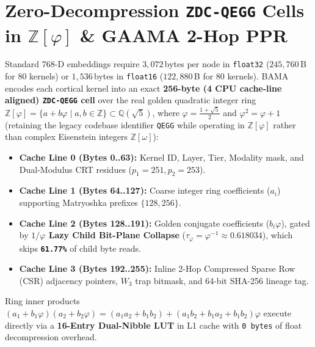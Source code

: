 \documentclass[10pt,twocolumn,letterpaper]{article}
\begin{document}
\section{Zero-Decompression \texttt{ZDC-QEGG} Cells in $\mathbb{Z}[\varphi]$ \& GAAMA 2-Hop PPR}
Standard 768-D embeddings require $3,072$\,bytes per node in \texttt{float32} ($245,760$\,B for 80 kernels) or $1,536$\,bytes in \texttt{float16} ($122,880$\,B for 80 kernels). BAMA encodes each cortical kernel into an exact \textbf{256-byte (4 CPU cache-line aligned) \texttt{ZDC-QEGG} cell} over the real golden quadratic integer ring $\mathbb{Z}[\varphi] = \{a + b\varphi \mid a,b \in \mathbb{Z}\} \subset \mathbb{Q}(\sqrt{5})$, where $\varphi = \frac{1+\sqrt{5}}{2}$ and $\varphi^2 = \varphi + 1$ (retaining the legacy codebase identifier \texttt{QEGG} while operating in $\mathbb{Z}[\varphi]$ rather than complex Eisenstein integers $\mathbb{Z}[\omega]$):
\begin{itemize}
    \item \textbf{Cache Line 0 (Bytes 0..63):} Kernel ID, Layer, Tier, Modality mask, and Dual-Modulus CRT residues ($p_1=251, p_2=253$).
    \item \textbf{Cache Line 1 (Bytes 64..127):} Coarse integer ring coefficients ($a_i$) supporting Matryoshka \cite{kusupati2022matryoshka} prefixes $\{128, 256\}$.
    \item \textbf{Cache Line 2 (Bytes 128..191):} Golden conjugate coefficients ($b_i \varphi$), gated by \textbf{$1/\varphi$ Lazy Child Bit-Plane Collapse} ($\tau_\varphi = \varphi^{-1} \approx 0.618034$), which skips \textbf{\texttt{61.77\%}} of child byte reads.
    \item \textbf{Cache Line 3 (Bytes 192..255):} Inline 2-Hop Compressed Sparse Row (CSR) adjacency pointers, $W_3$ trap bitmask, and 64-bit SHA-256 lineage tag.
\end{itemize}
Ring inner products $(a_1 + b_1\varphi)(a_2 + b_2\varphi) = (a_1 a_2 + b_1 b_2) + (a_1 b_2 + b_1 a_2 + b_1 b_2)\varphi$ execute directly via a \textbf{16-Entry Dual-Nibble LUT} in L1 cache with \texttt{0\,bytes} of float decompression overhead.
\end{document}

